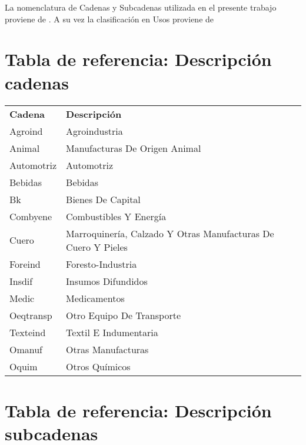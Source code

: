 \documentclass[class=article, crop=false]{standalone}
\begin{document}
La nomenclatura de Cadenas y Subcadenas utilizada en el presente trabajo proviene de \cite{molinari2016especializacion}. A su vez la clasificación en Usos proviene de \cite{flores2008world}
	
\section{Tabla de referencia: Descripción cadenas}



\begin{table}[!ht]
	\begin{tabular}{ll}
		\textbf{Cadena} & \textbf{Descripción} \\
		Agroind & Agroindustria \\
		Animal & Manufacturas De Origen Animal \\
		Automotriz & Automotriz \\
		Bebidas & Bebidas \\
		Bk & Bienes De Capital \\
		Combyene & Combustibles Y Energía \\
		Cuero & Marroquinería, Calzado Y Otras Manufacturas De Cuero Y Pieles \\
		Foreind & Foresto-Industria \\
		Insdif & Insumos Difundidos \\
		Medic & Medicamentos \\
		Oeqtransp & Otro Equipo De Transporte \\
		Texteind & Textil E Indumentaria \\
		Omanuf & Otras Manufacturas \\
		Oquim & Otros Químicos
	\end{tabular}
\label{table:cadenas}
\end{table}



\section{Tabla de referencia: Descripción subcadenas}
\end{document}
